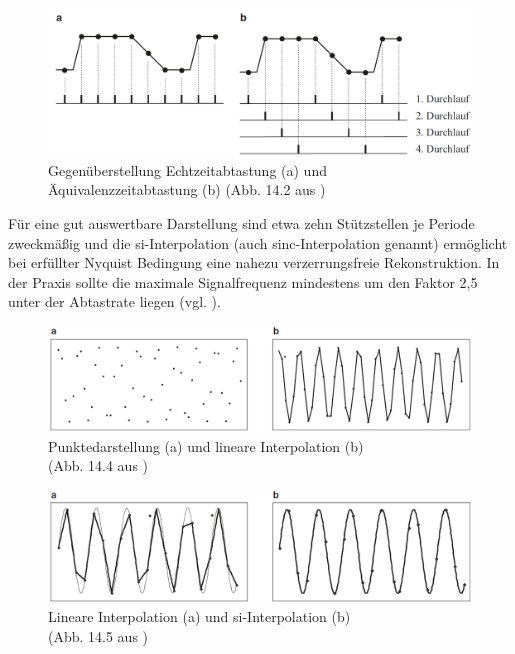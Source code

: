 \documentclass[a4paper, portrait, 12pt]{scrartcl} %
\begin{document}
\begin{figure}[H]
	\centering
    \includegraphics[scale=0.4]{real_equivalent_sampling_muehl.png} 
	\caption{Gegenüberstellung Echtzeitabtastung (a) und Äquivalenzzeitabtastung (b) (Abb. 14.2 aus \cite[S. 216]{Muehl2020})}
	\label{fig:real_equivalent_sampling}
\end{figure}

Für eine gut auswertbare Darstellung sind etwa zehn Stützstellen je Periode zweckmäßig und die si-Interpolation (auch sinc-Interpolation genannt) ermöglicht bei erfüllter Nyquist Bedingung eine nahezu verzerrungsfreie Rekonstruktion. In der Praxis sollte die maximale Signalfrequenz mindestens um den Faktor 2,5 unter der Abtastrate liegen (vgl. \cite[S. 218f]{Muehl2020}).

\begin{figure}[H]
	\centering
		\includegraphics[scale=0.4]{point_linear_display_muehl.png} 
		\caption{\centering Punktedarstellung (a) und lineare Interpolation (b)\\(Abb. 14.4 aus \cite[S. 218]{Muehl2020})}
	\label{fig:point_linear_display}
\end{figure}

\begin{figure}[H]
	\centering
		\includegraphics[scale=0.4]{linear_si_display_muehl.png} 
		\caption{\centering Lineare Interpolation (a) und si-Interpolation (b)\\(Abb. 14.5 aus \cite[S. 219]{Muehl2020})}
	\label{fig:linear_si_display}
\end{figure}
\end{document}
